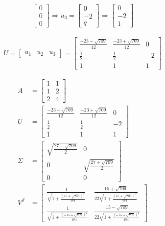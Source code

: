 \documentclass[a4paper, spanish]{article}
\begin{document}
\begin{align}
\begin{bmatrix}
        0 \\
        0 \\
        0
      \end{bmatrix}
      \Rightarrow
      u_3 =
      \begin{bmatrix}
        0 \\
        -2 \\
        q
      \end{bmatrix}
      \Rightarrow
      \begin{bmatrix}
        0 \\
        -2 \\
        1
      \end{bmatrix}
    \end{align}

    \begin{align}
      U =
      \begin{bmatrix}
        u_1 & u_2 & u_3
      \end{bmatrix} =
      \begin{bmatrix}
        \frac{-23-\sqrt{709}}{12} & \frac{-23+\sqrt{709}}{12} & 0 \\
        \frac{1}{2} & \frac{1}{2} & - 2 \\
        1 & 1 & 1
      \end{bmatrix}
    \end{align}


    \begin{align}
      A &=
      \begin{bmatrix}
        1 & 1\\
        1 & 2\\
        2 & 4
      \end{bmatrix} \\
      U &=
      \begin{bmatrix}
        \frac{-23-\sqrt{709}}{12} & \frac{-23+\sqrt{709}}{12} & 0 \\
        \frac{1}{2} & \frac{1}{2} & - 2 \\
        1 & 1 & 1
      \end{bmatrix} \\
      \Sigma &=
      \begin{bmatrix}
        \sqrt{\frac{27 - \sqrt{709}}{2}} & 0 \\
        0 & \sqrt{\frac{27 + \sqrt{709}}{2}} \\
        0 & 0
      \end{bmatrix} \\
      V^T &=
      \begin{bmatrix}
        \frac{1}{\sqrt{1 + \frac{(15 + \sqrt{709})^2}{484}}} &  \frac{15 + \sqrt{709}}{22\sqrt{1 + \frac{(15 + \sqrt{709})^2}{484}}}  \\
        \frac{1}{\sqrt{1 + \frac{(- 15 + \sqrt{709})^2}{484}}} & \frac{15 - \sqrt{709}}{22\sqrt{1 + \frac{(- 15 + \sqrt{709})^2}{484}}}
      \end{bmatrix}
    \end{align}
\end{document}
